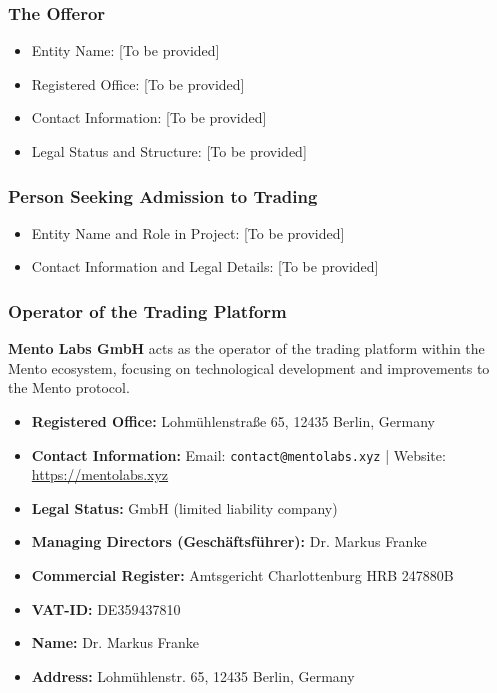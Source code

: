 \documentclass[a4paper]{article}
\theoremstyle{definition}
\begin{document}
\begin{appendices}
\subsubsection{The Offeror}
\begin{itemize}
    \item Entity Name: [To be provided]
    \item Registered Office: [To be provided]
    \item Contact Information: [To be provided]
    \item Legal Status and Structure: [To be provided]
\end{itemize}

\subsubsection{Person Seeking Admission to Trading}
\begin{itemize}
    \item Entity Name and Role in Project: [To be provided]
    \item Contact Information and Legal Details: [To be provided]
\end{itemize}

\subsubsection{Operator of the Trading Platform}

\textbf{Mento Labs GmbH} acts as the operator of the trading platform within the Mento ecosystem, focusing on technological development and improvements to the Mento protocol.

\begin{itemize}
    \item \textbf{Registered Office:} Lohmühlenstraße 65, 12435 Berlin, Germany
    \item \textbf{Contact Information:} Email: \texttt{contact@mentolabs.xyz} | Website: \url{https://mentolabs.xyz}
    \item \textbf{Legal Status:} GmbH (limited liability company)
    \item \textbf{Managing Directors (Geschäftsführer):} Dr. Markus Franke
    \item \textbf{Commercial Register:} Amtsgericht Charlottenburg HRB 247880B
    \item \textbf{VAT-ID:} DE359437810
\end{itemize}
\begin{itemize}
    \item \textbf{Name:} Dr. Markus Franke
    \item \textbf{Address:} Lohmühlenstr. 65, 12435 Berlin, Germany
\end{itemize}


\end{appendices}
\end{document}
